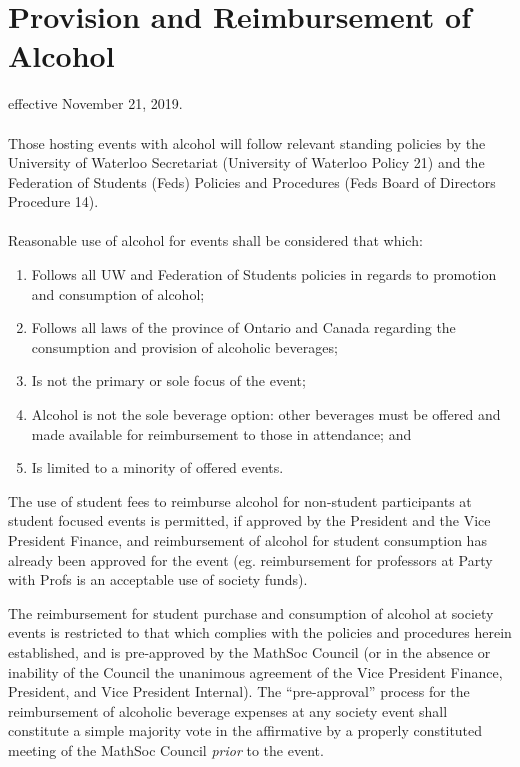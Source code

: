 \section{Provision and Reimbursement of Alcohol}
effective November 21, 2019.
\paragraph{}

Those hosting events with alcohol will follow relevant standing policies by the University of Waterloo Secretariat (University of Waterloo Policy 21) and the Federation of Students (Feds) Policies and Procedures (Feds Board of Directors Procedure 14).
\paragraph{}
Reasonable use of alcohol for events shall be considered that which:
\begin{enumerate}
\item Follows all UW and Federation of Students policies in regards to promotion and consumption of alcohol;
\item Follows all laws of the province of Ontario and Canada regarding the consumption and provision of alcoholic beverages;
\item Is not the primary or sole focus of the event;
\item Alcohol is not the sole beverage option: other beverages must be offered and made available for reimbursement to those in attendance; and
\item Is limited to a minority of offered events.
\end{enumerate}

The use of student fees to reimburse alcohol for non-student participants at student focused events is permitted, if approved by the President and the Vice President Finance, and reimbursement of alcohol for student consumption has already been approved for the event (eg. reimbursement for professors at Party with Profs is an acceptable use of society funds).

The reimbursement for student purchase and consumption of alcohol at society events is restricted to that which complies with the policies and procedures herein established, and is pre-approved by the MathSoc Council (or in the absence or inability of the Council the unanimous agreement of the Vice President Finance, President, and Vice President Internal). The “pre-approval” process for the reimbursement of alcoholic beverage expenses at any society event shall constitute a simple majority vote in the affirmative by a properly constituted meeting of the MathSoc Council \textit{prior} to the event.

